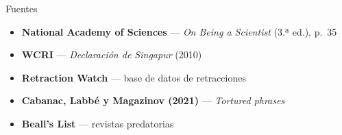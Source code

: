 \documentclass[11pt,aspectratio=169,xcolor=table]{beamer}
\newcommand{\iconitem}[4][usachrojo]{%
  \item[\textcolor{#1}{#2}] \textbf{#3} — #4}
\begin{document}

\begingroup
\renewcommand{\insertsectionhead}{}
\begin{frame}{Fuentes}
  \begin{itemize}\usachaire
    \iconitem[usachverde]{\faBook}{National Academy of Sciences}{\emph{On Being a Scientist} (3.ª ed.), p.~35}
    \iconitem[usachverde]{\faBook}{WCRI}{\emph{Declaración de Singapur} (2010)}
    \iconitem[usachverde]{\faBook}{Retraction Watch}{base de datos de retracciones}
    \iconitem[usachverde]{\faBook}{Cabanac, Labbé y Magazinov (2021)}{\emph{Tortured phrases}}
    \iconitem[usachverde]{\faBook}{Beall's List}{revistas predatorias}
  \end{itemize}
\end{frame}
\endgroup

\end{document}
